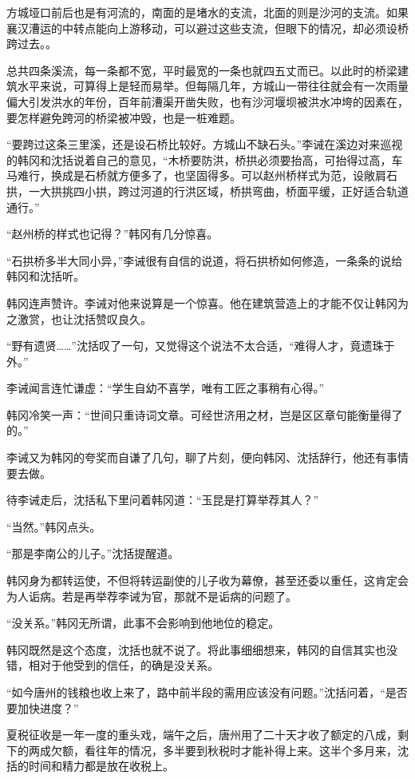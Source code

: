 方城垭口前后也是有河流的，南面的是堵水的支流，北面的则是沙河的支流。如果襄汉漕运的中转点能向上游移动，可以避过这些支流，但眼下的情况，却必须设桥跨过去。。

总共四条溪流，每一条都不宽，平时最宽的一条也就四五丈而已。以此时的桥梁建筑水平来说，可算得上是轻而易举。但每隔几年，方城山一带往往就会有一次雨量偏大引发洪水的年份，百年前漕渠开凿失败，也有沙河堰坝被洪水冲垮的因素在，要怎样避免跨河的桥梁被冲毁，也是一桩难题。

“要跨过这条三里溪，还是设石桥比较好。方城山不缺石头。”李诫在溪边对来巡视的韩冈和沈括说着自己的意见，“木桥要防洪，桥拱必须要抬高，可抬得过高，车马难行，换成是石桥就方便多了，也坚固得多。可以赵州桥样式为范，设敞肩石拱，一大拱挑四小拱，跨过河道的行洪区域，桥拱弯曲，桥面平缓，正好适合轨道通行。”

“赵州桥的样式也记得？”韩冈有几分惊喜。

“石拱桥多半大同小异，”李诫很有自信的说道，将石拱桥如何修造，一条条的说给韩冈和沈括听。

韩冈连声赞许。李诫对他来说算是一个惊喜。他在建筑营造上的才能不仅让韩冈为之激赏，也让沈括赞叹良久。

“野有遗贤……”沈括叹了一句，又觉得这个说法不太合适，“难得人才，竟遗珠于外。”

李诫闻言连忙谦虚：“学生自幼不喜学，唯有工匠之事稍有心得。”

韩冈冷笑一声：“世间只重诗词文章。可经世济用之材，岂是区区章句能衡量得了的。”

李诫又为韩冈的夸奖而自谦了几句，聊了片刻，便向韩冈、沈括辞行，他还有事情要去做。

待李诫走后，沈括私下里问着韩冈道：“玉昆是打算举荐其人？”

“当然。”韩冈点头。

“那是李南公的儿子。”沈括提醒道。

韩冈身为都转运使，不但将转运副使的儿子收为幕僚，甚至还委以重任，这肯定会为人诟病。若是再举荐李诫为官，那就不是诟病的问题了。

“没关系。”韩冈无所谓，此事不会影响到他地位的稳定。

韩冈既然是这个态度，沈括也就不说了。将此事细细想来，韩冈的自信其实也没错，相对于他受到的信任，的确是没关系。

“如今唐州的钱粮也收上来了，路中前半段的需用应该没有问题。”沈括问着，“是否要加快进度？”

夏税征收是一年一度的重头戏，端午之后，唐州用了二十天才收了额定的八成，剩下的两成欠额，看往年的情况，多半要到秋税时才能补得上来。这半个多月来，沈括的时间和精力都是放在收税上。

